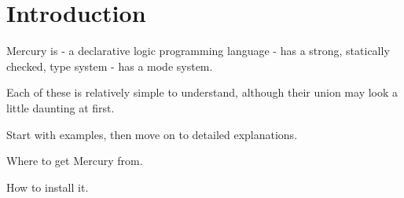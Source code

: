 
\chapter{Introduction}

Mercury is
- a declarative logic programming language
- has a strong, statically checked, type system
- has a mode system.

Each of these is relatively simple to understand, although their union
may look a little daunting at first.

Start with examples, then move on to detailed explanations.

Where to get Mercury from.

How to install it.


